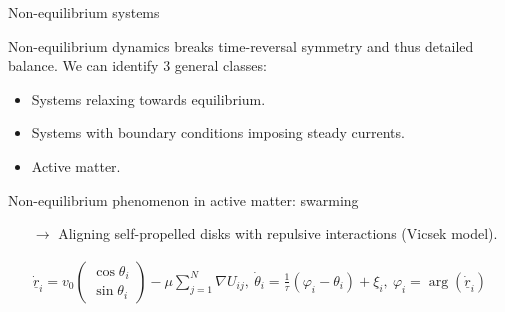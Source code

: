 \documentclass{beamer}
\begin{document}
\begin{frame}[t]{Non-equilibrium systems}

Non-equilibrium dynamics breaks time-reversal symmetry and thus detailed balance. \pause We can identify 3 general classes:
\begin{itemize}[<+->]
  \item Systems relaxing towards equilibrium.
  \item Systems with boundary conditions imposing steady currents.
  \item Active matter.
\end{itemize}



\end{frame}

\begin{frame}{Non-equilibrium phenomenon in active matter: swarming}

\begin{itemize}
  \item[$\rightarrow$] Aligning self-propelled disks with repulsive interactions (Vicsek model).
\end{itemize}
\vspace{-5pt}
\begin{align*}
\dot{\underline{r}}_i = v_0 \begin{pmatrix} \cos \theta_i \\ \sin \theta_i \end{pmatrix} - \mu \sum_{j=1}^N \nabla U_{ij},~ \dot{\theta}_i = \frac{1}{\tau} (\varphi_i - \theta_i) + \xi_i,~ \varphi_i = \arg(\dot{\underline{r}}_i)
\end{align*}

\vspace{-10pt}


\end{frame}
\end{document}
